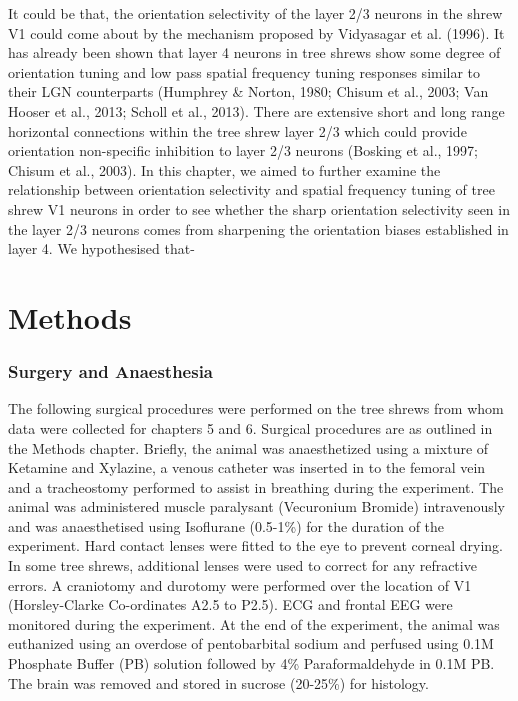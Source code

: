 It could be that, the orientation selectivity of the layer 2/3 neurons in the shrew V1 could come about by the mechanism proposed by Vidyasagar et al. (1996). It has already been shown that layer 4 neurons in tree shrews show some degree of orientation tuning and low pass spatial frequency tuning responses similar to their LGN counterparts (Humphrey \& Norton, 1980; Chisum et al., 2003; Van Hooser et al., 2013; Scholl et al., 2013). There are extensive short and long range horizontal connections within the tree shrew layer 2/3 which could provide orientation non-specific inhibition to layer 2/3 neurons (Bosking et al., 1997; Chisum et al., 2003). In this chapter, we aimed to further examine the relationship between orientation selectivity and spatial frequency tuning of tree shrew V1 neurons in order to see whether the sharp orientation selectivity seen in the layer 2/3 neurons comes from sharpening the orientation biases established in layer 4. We hypothesised that-





\section{Methods}


\subsubsection{Surgery and Anaesthesia}

The following surgical procedures were performed on the tree shrews from whom data were collected for chapters 5 and 6. Surgical procedures are as outlined in the Methods chapter. Briefly, the animal was anaesthetized using a mixture of Ketamine and Xylazine, a venous catheter was inserted in to the femoral vein and a tracheostomy performed to assist in breathing during the experiment. The animal was administered muscle paralysant (Vecuronium Bromide) intravenously and was anaesthetised using Isoflurane (0.5-1\%) for the duration of the experiment. Hard contact lenses were fitted to the eye to prevent corneal drying. In some tree shrews, additional lenses were used to correct for any refractive errors. A craniotomy and durotomy were performed over the location of V1 (Horsley-Clarke Co-ordinates A2.5 to P2.5). ECG and frontal EEG were monitored during the experiment. At the end of the experiment, the animal was euthanized using an overdose of pentobarbital sodium and perfused using 0.1M Phosphate Buffer (PB) solution followed by 4\% Paraformaldehyde in 0.1M PB. The brain was removed and stored in sucrose (20-25\%) for histology.

